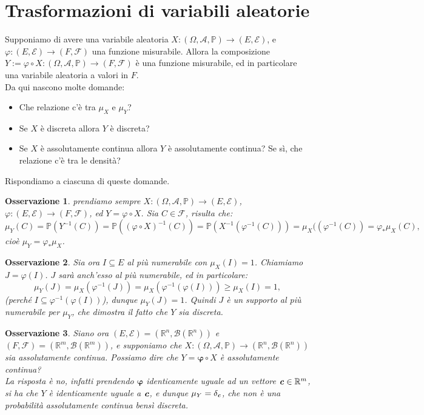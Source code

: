 \documentclass[11pt]{book}
\theoremstyle{Definizione}
\theoremstyle{TeoremaProposizioneLemmaCorollario}
\theoremstyle{OsservazioneNota}
\newtheorem{myobs}{Osservazione}[section]
\newcommand{\R}{\mathbb{R}}
\newcommand{\mybold}[1]{\boldsymbol{#1}}
\newcommand{\gri}[1]{\textbf{\textit{{#1}}}}
\renewcommand{\P}{\mathbb{P}}
\begin{document}
\section{Trasformazioni di variabili aleatorie}
Supponiamo di avere una variabile aleatoria $X:(\Omega,\mathcal{A},\P)\longrightarrow (E,\mathcal{E})$, e $\varphi:(E,\mathcal{E})\longrightarrow (F,\mathcal{F})$ una funzione misurabile. Allora la composizione $Y:= \varphi \circ X : (\Omega,\mathcal{A},\P) \longrightarrow (F,\mathcal{F})$ è una funzione misurabile, ed in particolare una variabile aleatoria a valori in $F$.\\
Da qui nascono molte domande:
\begin{itemize}
\item Che relazione c'è tra $\mu_X$ e $\mu_Y$?
\item Se $X$ è discreta allora $Y$ è discreta?
\item Se $X$ è assolutamente continua allora $Y$ è assolutamente continua? Se sì, che relazione c'è tra le densità?
\end{itemize}
Rispondiamo a ciascuna di queste domande.
\begin{myobs}
prendiamo sempre $X:(\Omega,\mathcal{A},\P)\longrightarrow (E,\mathcal{E})$, $\varphi:(E,\mathcal{E})\longrightarrow (F,\mathcal{F})$, ed $Y = \varphi \circ X$.
Sia $C\in \mathcal{F}$, risulta che:
$$
\mu_Y(C) = \P(Y^{-1}(C)) = \P((\varphi\circ X)^{-1}(C)) = \P(X^{-1}(\varphi^{-1}(C))) = \mu_X((\varphi^{-1}(C)) = \varphi_*\mu_X(C),
$$
cioè $\mu_Y = \varphi_*\mu_X$.
\end{myobs}
\begin{myobs}
Sia ora $I \subseteq E$ al più numerabile con $\mu_X(I) = 1$. Chiamiamo $J = \varphi(I)$. $J$ sarà anch'esso al più numerabile, ed in particolare:
$$
\mu_Y(J) = \mu_X(\varphi^{-1}(J)) = \mu_X(\varphi^{-1}(\varphi(I))) \geq \mu_X(I) = 1,
$$
(perché $I \subseteq \varphi^{-1}(\varphi(I))$), dunque $\mu_Y(J) = 1$. Quindi $J$ è un supporto al più numerabile per $\mu_Y$, che dimostra il fatto che $Y$ sia discreta.
\end{myobs}
\begin{myobs}
Siano ora $(E,\mathcal{E}) = (\R^n,\mathcal{B}(\R^n))$ e $(F,\mathcal{F}) = (\R^m,\mathcal{B}(\R^m))$, e supponiamo che $X:(\Omega,\mathcal{A},\P) \longrightarrow (\R^n,\mathcal{B}(\R^n))$ sia assolutamente continua. Possiamo dire che $Y = \mybold{\varphi} \circ X$ è assolutamente continua?\\
La risposta è no, infatti prendendo $\mybold{\varphi}$ identicamente uguale ad un vettore $\gri{c}\in \R^m$, si ha che $Y$ è identicamente uguale a $\gri{c}$, e dunque $\mu_Y = \delta_{\gri{c}}$, che non è una probabilità assolutamente continua bensì discreta.
\end{myobs}
\end{document}
